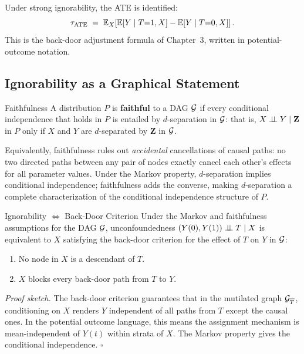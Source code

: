 \documentclass[master.tex]{subfiles}
\begin{document}
Under strong ignorability, the ATE is identified:
\begin{equation}
  \tau_{\mathrm{ATE}}
  \;=\; \mathbb{E}_X\!\left[\mathbb{E}[Y \mid T{=}1, X] - \mathbb{E}[Y \mid T{=}0, X]\right].
  \label{w4:eq:ate-id}
\end{equation}
This is the back-door adjustment formula of Chapter~3, written in
potential-outcome notation.

\subsection{Ignorability as a Graphical Statement}

\begin{defn}{Faithfulness}
\label{w4:defn:faithfulness}
A distribution $P$ is \textbf{faithful} to a DAG $\mathcal{G}$ if every
conditional independence that holds in $P$ is entailed by
$d$-separation in $\mathcal{G}$: that is, $X \perp\!\!\!\perp Y \mid \mathbf{Z}$ in
$P$ only if $X$ and $Y$ are $d$-separated by $\mathbf{Z}$ in $\mathcal{G}$.

Equivalently, faithfulness rules out \emph{accidental} cancellations of
causal paths: no two directed paths between any pair of nodes exactly
cancel each other's effects for all parameter values.  Under the Markov
property, $d$-separation implies conditional independence; faithfulness
adds the converse, making $d$-separation a complete characterization of
the conditional independence structure of $P$.
\end{defn}

\begin{thm}{Ignorability $\Leftrightarrow$ Back-Door Criterion}
\label{w4:thm:ign-bd}
Under the Markov and faithfulness assumptions for the DAG $\mathcal{G}$,
unconfoundedness $(Y(0), Y(1)) \perp\!\!\!\perp T \mid X$ is equivalent to $X$
satisfying the back-door criterion for the effect of $T$ on $Y$ in $\mathcal{G}$:
\begin{enumerate}
  \item No node in $X$ is a descendant of $T$.
  \item $X$ blocks every back-door path from $T$ to $Y$.
\end{enumerate}
\end{thm}

\noindent\textit{Proof sketch.}
The back-door criterion guarantees that in the mutilated graph
$\mathcal{G}_{\overline{T}}$, conditioning on $X$ renders $Y$ independent of all
paths from $T$ except the causal ones.  In the potential outcome language,
this means the assignment mechanism is mean-independent of $Y(t)$ within
strata of $X$.  The Markov property gives the conditional independence.
\hfill$\square$
\end{document}

